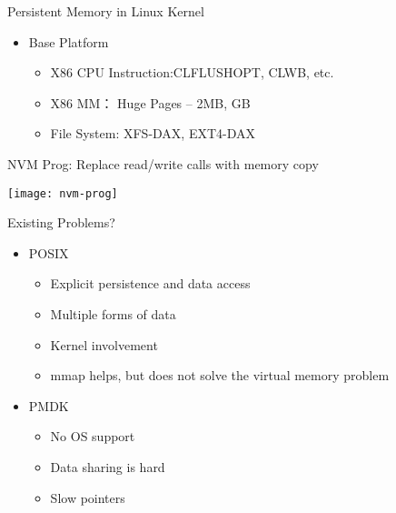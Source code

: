 \begin{frame}
    
    Persistent Memory in Linux Kernel
    
    \begin{itemize}
        \item Base Platform
        \begin{itemize}
            \item X86 CPU Instruction:CLFLUSHOPT, CLWB, etc.                    
            \item X86 MM：  Huge Pages – 2MB, GB                        
            \item File System: XFS-DAX, EXT4-DAX                        
        \end{itemize}
    \end{itemize}   
    
    
\end{frame}
\begin{frame}
    
    
    
    NVM Prog: Replace read/write calls with memory copy
    
    
    \texttt{[image: nvm-prog]}
    
    
    
    
\end{frame}

\begin{frame}
    
    Existing Problems?
    
    \begin{itemize}
    \item POSIX
    \begin{itemize}
        \item Explicit persistence and data access         
        \item Multiple forms of data         
        \item Kernel involvement
        \item  mmap helps, but does not solve the
        virtual memory problem        
    \end{itemize}
    \item  PMDK
    
    \begin{itemize}
        \item No OS support
        \item Data sharing is hard        
        \item Slow pointers        
    \end{itemize}    
\end{itemize}   
    
\end{frame}

